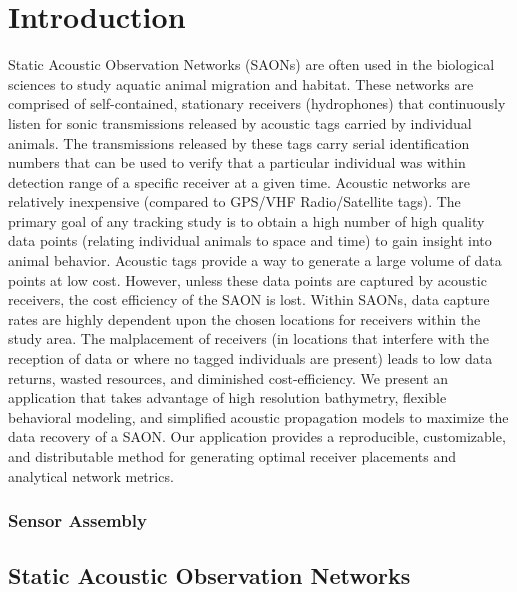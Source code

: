 \chapter{Introduction}
Static Acoustic Observation Networks (SAONs) are often used in the biological sciences to study aquatic animal migration and habitat.  These networks are comprised of self-contained, stationary receivers (hydrophones) that continuously listen for sonic transmissions released by acoustic tags carried by individual animals.  The transmissions released by these tags carry serial identification numbers that can be used to verify that a particular individual was within detection range of a specific receiver at a given time.  Acoustic networks are relatively inexpensive (compared to GPS/VHF Radio/Satellite tags).  The primary goal of any tracking study is to obtain a high number of high quality data points (relating individual animals to space and time) to gain insight into animal behavior.  Acoustic tags provide a way to generate a large volume of data points at low cost.  However, unless these data points are captured by acoustic receivers, the cost efficiency of the SAON is lost.  Within SAONs, data capture rates are highly dependent upon the chosen locations for receivers within the study area.  The malplacement of receivers (in locations that interfere with the reception of data or where no tagged individuals are present) leads to low data returns, wasted resources, and diminished cost-efficiency.  We present an application \cite{acousitcdeploy} that takes advantage of high resolution bathymetry, flexible behavioral modeling, and simplified acoustic propagation models to maximize the data recovery of a SAON.  Our application provides a reproducible, customizable, and distributable method for generating optimal receiver placements and analytical network metrics.

\subsection{Sensor Assembly}
\section{Static Acoustic Observation Networks}

